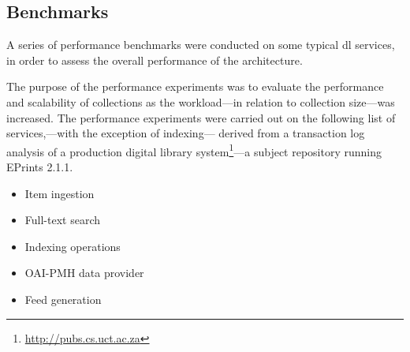 \begin{landscape}
\centering

\end{landscape}

\begin{landscape}
\centering

\end{landscape}

\subsection{Benchmarks}
\label{sec:evaluation:performance:aspect-benchmarks}

A series of performance benchmarks were conducted on some typical \gls{dl} services, in order to assess the overall performance of the architecture.

The purpose of the performance experiments was to evaluate the performance and scalability of collections as the workload---in relation to collection size---was increased. The performance experiments were carried out on the following list of services,---with the exception of indexing--- derived from a transaction log analysis of a production digital library system\footnote{\url{http://pubs.cs.uct.ac.za}}---a subject repository running EPrints 2.1.1.

\begin{itemize}
 \item Item ingestion
 \item Full-text search
 \item Indexing operations
 \item OAI-PMH data provider
 \item Feed generation
\end{itemize}

